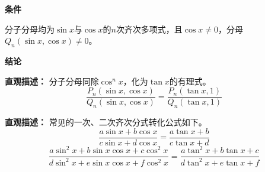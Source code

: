 \begin{statementbox}
	\textbf{\textcolor{CStatement}{条件}}
	\begin{description}[style=nextline, leftmargin=2.8em, labelsep=0.5em, itemsep=0.35em]
		\item[\textbf{\textcolor{CStatement}{条件 1（齐次分式）：}}]分子分母均为$\sin x$与$\cos x$的$n$次齐次多项式，且$\cos x\neq 0$，分母$Q_n(\sin x,\cos x)\neq 0$。
	\end{description}

	\textbf{\textcolor{CStatement}{结论}}
	\begin{description}[style=nextline, leftmargin=2.8em, labelsep=0.5em, itemsep=0.45em]
		\item[\textbf{\textcolor{CStatement}{结论一（切化弦公式）：}}]
			\textbf{\textcolor{CStatement}{直观描述：}}
			分子分母同除$\cos^n x$，化为$\tan x$的有理式。
			\[
				\boxed{\frac{P_n(\sin x,\cos x)}{Q_n(\sin x,\cos x)} = \frac{P_n(\tan x,1)}{Q_n(\tan x,1)}}
			\]

		\item[\textbf{\textcolor{CStatement}{特例（一次与二次）：}}]
			\textbf{\textcolor{CStatement}{直观描述：}}
			常见的一次、二次齐次分式转化公式如下。
			\[
				\frac{a\sin x+b\cos x}{c\sin x+d\cos x}=\frac{a\tan x+b}{c\tan x+d}
			\]
			\[
				\frac{a\sin^{2}x+b\sin x\cos x+c\cos^{2}x}{d\sin^{2}x+e\sin x\cos x+f\cos^{2}x}=\frac{a\tan^{2}x+b\tan x+c}{d\tan^{2}x+e\tan x+f}
			\]
	\end{description}
\end{statementbox}
